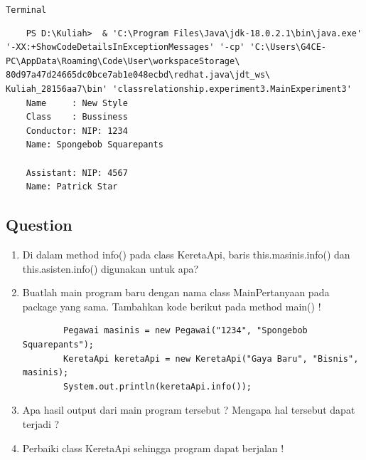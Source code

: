 \documentclass[12pt,titlepage]{article}
\begin{document}
\newpage
\noindent \texttt{Terminal}
\begin{verbatim}
    PS D:\Kuliah>  & 'C:\Program Files\Java\jdk-18.0.2.1\bin\java.exe' '-XX:+ShowCodeDetailsInExceptionMessages' '-cp' 'C:\Users\G4CE-PC\AppData\Roaming\Code\User\workspaceStorage\ 80d97a47d24665dc0bce7ab1e048ecbd\redhat.java\jdt_ws\ Kuliah_28156aa7\bin' 'classrelationship.experiment3.MainExperiment3'
    Name     : New Style       
    Class    : Bussiness       
    Conductor: NIP: 1234       
    Name: Spongebob Squarepants

    Assistant: NIP: 4567       
    Name: Patrick Star
\end{verbatim}

\subsection{Question}
\begin{enumerate}
    \item Di dalam method info() pada class KeretaApi, baris this.masinis.info() dan this.asisten.info() digunakan untuk apa?
    \item Buatlah main program baru dengan nama class MainPertanyaan pada package yang sama. Tambahkan kode berikut pada method main() !
    \begin{verbatim}
        Pegawai masinis = new Pegawai("1234", "Spongebob Squarepants");
        KeretaApi keretaApi = new KeretaApi("Gaya Baru", "Bisnis", masinis);
        System.out.println(keretaApi.info());
    \end{verbatim} 
    \item Apa hasil output dari main program tersebut ? Mengapa hal tersebut dapat terjadi ?
    \item Perbaiki class KeretaApi sehingga program dapat berjalan !
\end{enumerate}
\end{document}
